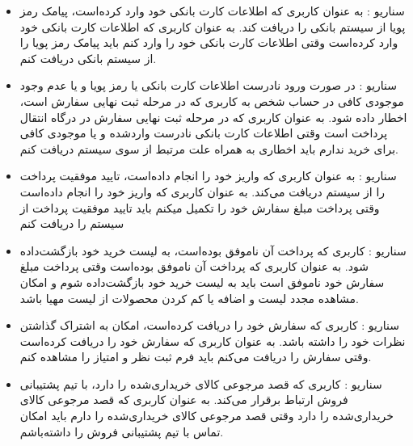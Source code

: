 \documentclass[14pt]{article}
\begin{document}
\begin{flushright}
\begin{itemize}
\item سناریو : به عنوان کاربری که اطلاعات کارت بانکی خود وارد کرده‌است، پیامک رمز پویا از سیستم بانکی را دریافت کند.
\newline
به عنوان کاربری که اطلاعات کارت بانکی خود وارد کرده‌است
\newline
وقتی اطلاعات کارت بانکی خود را وارد کنم 
\newline
باید پیامک رمز پویا را از سیستم بانکی دریافت کنم.

\item سناریو : در صورت ورود نادرست اطلاعات کارت بانکی یا رمز پویا و یا عدم وجود موجودی کافی در حساب شخص به کاربری که در مرحله ثبت نهایی سفارش است، اخطار داده شود.
\newline
به عنوان کاربری که در مرحله ثبت نهایی سفارش در درگاه انتقال پرداخت است
\newline
وقتی اطلاعات کارت بانکی نادرست وارد‌شده و یا موجودی کافی برای خرید ندارم
\newline
باید اخطاری به همراه علت مرتبط از سوی سیستم دریافت کنم.

\item سناریو : به عنوان کاربری که واریز خود را انجام داده‌است، تایید موفقیت پرداخت را از سیستم دریافت می‌کند.
\newline
به عنوان کاربری که واریز خود را انجام داده‌است
\newline
وقتی پرداخت مبلغ سفارش خود را تکمیل میکنم
\newline
باید تایید موفقیت پرداخت از سیستم را دریافت کنم

\item سناریو : کاربری که پرداخت آن ناموفق بوده‌است، به لیست خرید خود بازگشت‌داده شود.
\newline
به عنوان کاربری که پرداخت آن ناموفق بوده‌است
\newline
وقتی پرداخت مبلغ سفارش خود ناموفق است
\newline
باید به لیست خرید خود بازگشت‌داده شوم و امکان مشاهده مجدد لیست و اضافه یا کم کردن محصولات از لیست مهیا باشد.

\item سناریو : کاربری که سفارش خود را دریافت کرده‌است، امکان به اشتراک گذاشتن نظرات خود را داشته باشد.
\newline
به عنوان کاربری که سفارش خود را دریافت کرده‌است
\newline
وقتی سفارش را دریافت می‌کنم
\newline
باید فرم ثبت نظر و امتیاز را مشاهده کنم.

\item سناریو : کاربری که قصد مرجوعی کالای خریداری‌شده را دارد، با تیم پشتیبانی فروش ارتباط برقرار می‌کند.
\newline
به عنوان کاربری که قصد مرجوعی کالای خریداری‌شده را دارد
\newline
وقتی قصد مرجوعی کالای خریداری‌شده را دارم
\newline
باید امکان تماس با تیم پشتیبانی فروش را داشته‌باشم.


\end{itemize}
\end{flushright}
\end{document}
